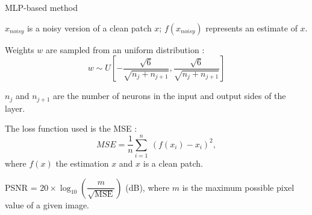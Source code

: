 \documentclass[8pt]{beamer}
\begin{document}
\begin{frame}{MLP-based method}
\begin{figure}[h]
\begin{minipage}[c]{9.5cm}
{
}%
\end{minipage}%
\end{figure}

\vspace{7pt}

$x_{noisy}$ is a noisy version of a clean patch $x$; $f(x_{noisy})$ represents an estimate of $x$.

\end{frame}


\begin{frame}
\begin{mybox}
Weights $w$ are sampled from an uniform distribution :  \\%
$$w \sim U\left[-\frac{\sqrt{6}}{\sqrt{n_j + n_{j+1}}}, \frac{\sqrt{6}}{\sqrt{n_j + n_{j+1}}}\right]$$

{\footnotesize $n_j$ and $n_{j+1}$ are the number of neurons in the input and output sides of the layer.}
\end{mybox}

\begin{mybox}
The loss function used is the MSE : $$MSE = \frac{1}{n} \sum_{i=1}^{n} \ (f(x_i)-x_i)^2,$$ where $f(x)$ the estimation $x$ and $x$ is a clean patch.
\end{mybox}

\begin{mybox}
PSNR = $20 \times \log_{10}\left(\dfrac{m}{\sqrt{\mathrm{MSE}}} \right)$ (dB), where $m$ is the maximum possible pixel value of a given image.
\end{mybox}
\end{frame}
\end{document}
